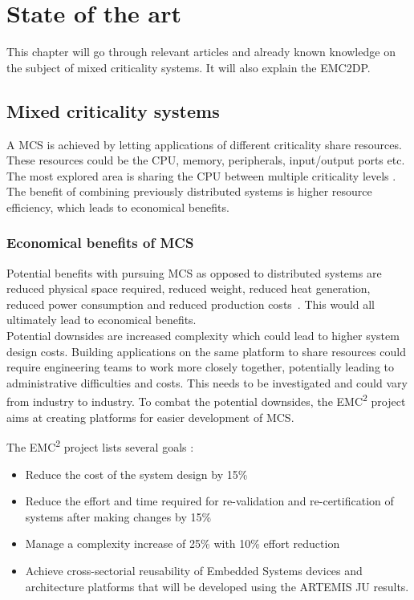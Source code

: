 \chapter{State of the art}
This chapter will go through relevant articles and already known knowledge on the subject of mixed criticality systems. It will also explain the EMC2DP.

\section{Mixed criticality systems}
A MCS is achieved by letting applications of different criticality share resources. These resources could be the CPU, memory, peripherals, input/output ports etc. The most explored area is sharing the CPU between multiple criticality levels \cite{burns2016}. The benefit of combining previously distributed systems is higher resource efficiency, which leads to economical benefits.\\


\subsection{Economical benefits of MCS}
Potential benefits with pursuing MCS as opposed to distributed systems are reduced physical space required, reduced weight, reduced heat generation, reduced power consumption and reduced production costs~\cite{burns2016}. This would all ultimately lead to economical benefits.\\

Potential downsides are increased complexity which could lead to higher system design costs. Building applications on the same platform to share resources could require engineering teams to work more closely together, potentially leading to administrative difficulties and costs. This needs to be investigated and could vary from industry to industry. To combat the potential downsides, the EMC\textsuperscript{2} project aims at creating platforms for easier development of MCS. %

The EMC\textsuperscript{2} project lists several goals \cite{website:emc2goals}:
\begin{itemize}
\item Reduce the cost of the system design by 15\%
\item Reduce the effort and time required for re-validation and re-certification of systems after making changes by 15\%
\item Manage a complexity increase of 25\% with 10\% effort reduction
\item Achieve cross-sectorial reusability of Embedded Systems devices and architecture platforms that will be developed using the ARTEMIS JU results.
\end{itemize}

